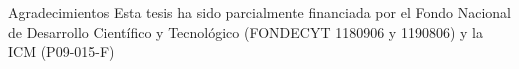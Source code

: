 \documentclass[aspectratio=169]{beamer}
\begin{document}
\begin{frame}{Agradecimientos}
    Esta tesis ha sido parcialmente financiada por el Fondo Nacional de Desarrollo Cient\'ifico y Tecnol\'ogico (FONDECYT 1180906 y 1190806) y la ICM (P09-015-F)
\end{frame}



{
\maketitle
}
\addtocounter{framenumber}{-1} %


\end{document}
